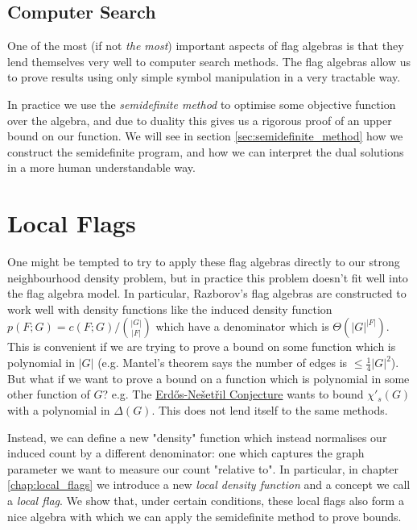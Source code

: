 \subsection*{Computer Search}

One of the most (if not \textit{the most}) important aspects of flag algebras is that
they lend themselves very well to computer search methods.
The flag algebras allow us to prove results using only simple symbol manipulation in a very
tractable way.

In practice we use the \textit{semidefinite method} to optimise some objective function
over the algebra, and due to duality this gives us a rigorous proof of an upper bound on our
function.
We will see in section \ref{sec:semidefinite_method} how we construct the semidefinite program,
and how we can interpret the dual solutions in a more human understandable way.

\section*{Local Flags}

One might be tempted to try to apply these flag algebras directly to our strong neighbourhood
density problem, but in practice this problem doesn't fit well into the flag algebra model.
In particular, Razborov's flag algebras are constructed to work well with density functions
like the induced density function $p(F; G) = c(F; G)/\binom{|G|}{|F|}$ which have a
denominator which is $\Theta(|G|^{|F|})$. This is convenient if we are trying to prove
a bound on some function which is polynomial in $|G|$
(e.g. Mantel's theorem says the number of edges is $\leq \frac{1}{4}|G|^2$). But what if
we want to prove a bound on a function which is polynomial in some other function
of $G$? e.g. The \hyperref[conj:intro_erdos_nesetril]{Erd\H{o}s-Nešetřil Conjecture}
wants to bound $\chi'_s(G)$ with a polynomial in $\Delta(G).$ This does not lend itself
to the same methods.

Instead, we can define a new "density" function which instead normalises our induced
count by a different denominator: one which captures the graph parameter we want to measure
our count "relative to". In particular, in chapter \ref{chap:local_flags} we introduce a
new \textit{local density function} and a concept we call a \textit{local flag}.
We show that, under certain conditions, these local flags also form a nice algebra
with which we can apply the semidefinite method to prove bounds.

